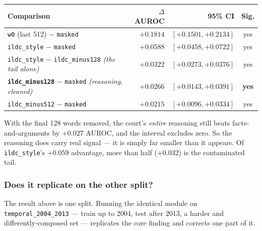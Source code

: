 \documentclass[12pt,a4paper]{article}
\newcommand{\code}[1]{\texttt{\small #1}}
\begin{document}
\begin{center}
\begin{tabular}{@{}lrrc@{}}
\toprule
\textbf{Comparison} & \textbf{$\Delta$AUROC} & \textbf{95\% CI} & \textbf{Sig.} \\
\midrule
\code{w0} (last 512) $-$ \code{masked} & $+0.1814$ & $[+0.1501, +0.2134]$ & yes \\
\code{ildc\_style} $-$ \code{masked} & $+0.0588$ & $[+0.0458, +0.0722]$ & yes \\
\code{ildc\_style} $-$ \code{ildc\_minus128} \emph{(the tail alone)} & $+0.0322$ & $[+0.0273, +0.0376]$ & yes \\
\midrule
\textbf{\code{ildc\_minus128}} $-$ \code{masked} \emph{(reasoning, cleaned)} & $\mathbf{+0.0266}$ & $\mathbf{[+0.0143, +0.0391]}$ & \textbf{yes} \\
\code{ildc\_minus512} $-$ \code{masked} & $+0.0215$ & $[+0.0096, +0.0334]$ & yes \\
\bottomrule
\end{tabular}
\end{center}

With the final 128 words removed, the court's \emph{entire} reasoning still beats facts-and-arguments
by $+0.027$ AUROC, and the interval excludes zero. So the reasoning does carry real signal --- it is
simply far smaller than it appears. Of \code{ildc\_style}'s $+0.059$ advantage, more than half
($+0.032$) is the contaminated tail.

\subsubsection*{Does it replicate on the other split?}

The result above is one split. Running the identical module on \code{temporal\_2004\_2013} --- train
up to 2004, test after 2013, a harder and differently-composed set --- replicates the core finding
and corrects one part of it.
\end{document}
